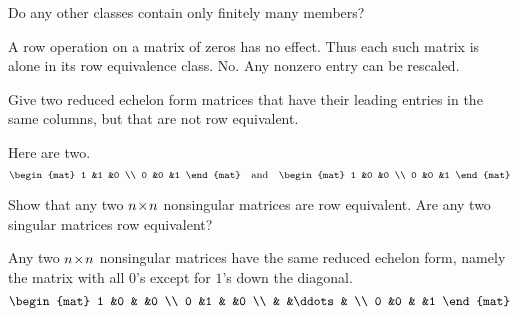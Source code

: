 \begin{exercises}
\begin{exparts}
      \partsitem Do any other classes contain only finitely many members?
    \end{exparts}
    \begin{answer}
     \begin{exparts}
      \partsitem A row operation on a matrix of zeros has no effect.
        Thus each such matrix is alone in its row equivalence class.  
      \partsitem No.
        Any nonzero entry can be rescaled.
     \end{exparts}
    \end{answer}
  \recommended \item 
    Give two reduced echelon form matrices that have their leading
    entries in the same columns,
    but that are not row equivalent.
    \begin{answer}
      Here are two.
      \begin{equation*}
        \begin{mat}
          1  &1  &0  \\
          0  &0  &1
        \end{mat}
        \quad\text{and}\quad
        \begin{mat}
          1  &0  &0  \\
          0  &0  &1
        \end{mat}
      \end{equation*}  
     \end{answer}
  \recommended \item 
    Show that any two \( n \! \times \! n \) nonsingular matrices are
    row equivalent.
    Are any two singular matrices row equivalent?
    \begin{answer}
      Any two \( n \! \times \! n \) nonsingular matrices have
      the same reduced echelon
      form, namely the matrix with all \( 0 \)'s except for \( 1 \)'s down
      the diagonal.
      \begin{equation*}
        \begin{mat}
          1  &0  &       &0  \\
          0  &1  &       &0  \\
             &   &\ddots &   \\
          0  &0  &       &1
        \end{mat}
      \end{equation*}


\end{answer}
\end{exercises}
